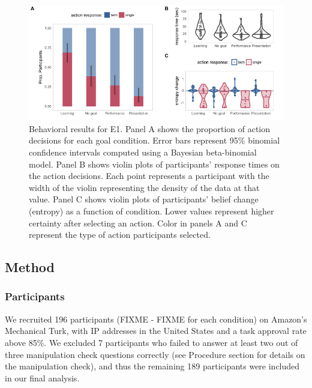 \documentclass[10pt, letterpaper]{article}
\newenvironment{CodeChunk}{}{}
\begin{document}
\begin{CodeChunk}
\begin{figure}[tb]

{\centering \includegraphics[width=0.95\linewidth]{figs/e1_behav_results_plot-1} 

}

\caption[Behavioral results for E1]{Behavioral results for E1. Panel A shows the proportion of action decisions for each goal condition. Error bars represent 95\% binomial confidence intervals computed using a Bayesian beta-binomial model. Panel B shows violin plots of participants' response times on the action decisions. Each point represents a participant with the width of the violin representing the density of the data at that value. Panel C shows violin plots of participants' belief change (entropy) as a function of condition. Lower values represent higher certainty after selecting an action. Color in panels A and C represent the type of action participants selected.}\label{fig:e1_behav_results_plot}
\end{figure}
\end{CodeChunk}

\subsection{Method}\label{method}

\subsubsection{Participants}\label{participants}

We recruited 196 participants (FIXME - FIXME for each condition) on
Amazon's Mechanical Turk, with IP addresses in the United States and a
task approval rate above 85\%. We excluded 7 participants who failed to
answer at least two out of three manipulation check questions correctly
(see Procedure section for details on the manipulation check), and thus
the remaining 189 participants were included in our final analysis.
\end{document}
